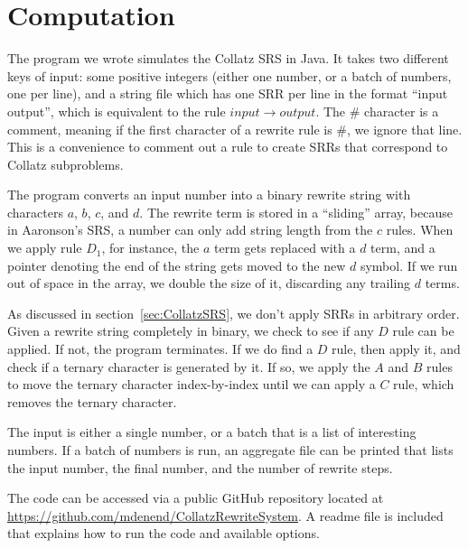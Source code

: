 \section{Computation} \label{subsec:rewritecomp}
The program we wrote simulates the Collatz SRS in Java. It takes two different keys of input: some positive integers (either one number, or a batch of numbers, one per line), and a string file which has one SRR per line in the format ``input output'', which is equivalent to the rule $input \rightarrow output$. The \# character is a comment, meaning if the first character of a rewrite rule is \#, we ignore that line. This is a convenience to comment out a rule to create SRRs that correspond to Collatz subproblems. \par
The program converts an input number into a binary rewrite string with characters $a$, $b$, $c$, and $d$. The rewrite term is stored in a ``sliding'' array, because in Aaronson's SRS, a number can only add string length from the $c$ rules. When we apply rule $D_1$, for instance, the $a$ term gets replaced with a $d$ term, and a pointer denoting the end of the string gets moved to the new $d$ symbol. If we run out of space in the array, we double the size of it, discarding any trailing $d$ terms. \par
As discussed in section~\ref{sec:CollatzSRS}, we don't apply SRRs in arbitrary order. Given a rewrite string completely in binary, we check to see if any $D$ rule can be applied. If not, the program terminates. If we do find a $D$ rule, then apply it, and check if a ternary character is generated by it. If so, we apply the $A$ and $B$ rules to move the ternary character index-by-index until we can apply a $C$ rule, which removes the ternary character. \par
The input is either a single number, or a batch that is a list of interesting numbers. If a batch of numbers is run, an aggregate file can be printed that lists the input number, the final number, and the number of rewrite steps.\par
The code can be accessed via a public GitHub repository located at \url{https://github.com/mdenend/CollatzRewriteSystem}. A readme file is included that explains how to run the code and available options.

